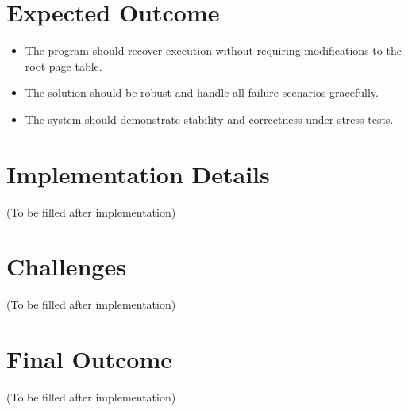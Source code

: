 \documentclass[a4paper,12pt]{report}
\begin{document}
\section{Expected Outcome}
\begin{itemize}
    \item The program should recover execution without requiring modifications to the root page table.
    \item The solution should be robust and handle all failure scenarios gracefully.
    \item The system should demonstrate stability and correctness under stress tests.
\end{itemize}

\section{Implementation Details}
(To be filled after implementation)

\section{Challenges}
(To be filled after implementation)

\section{Final Outcome}
(To be filled after implementation)
\end{document}
